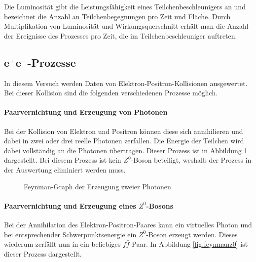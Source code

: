 Die Luminosität gibt die Leistungsfähigkeit eines Teilchenbeschleunigers an und bezeichnet die Anzahl an Teilchenbegegnungen pro Zeit und Fläche. Durch Multiplikation von Luminosität und Wirkungsquerschnitt erhält man die Anzahl der Ereignisse des Prozesses pro Zeit, die im Teilchenbeschleuniger auftreten. \cite{povh}


\subsection{e$^+$e$^-$-Prozesse}\label{sec:e+e-}

In diesem Versuch werden Daten von Elektron-Positron-Kollisionen ausgewertet. Bei dieser Kollision sind die folgenden verschiedenen Prozesse möglich. \cite{demtroeder}
\paragraph{Paarvernichtung und Erzeugung von Photonen}
Bei der Kollision von Elektron und Positron können diese sich annihilieren und dabei in zwei oder drei reelle Photonen zerfallen. Die Energie der Teilchen wird dabei vollständig an die Photonen übertragen. Dieser Prozess ist in Abbildung \ref{fig:feynmanphotonen} dargestellt. Bei diesem Prozess ist kein $Z^0$-Boson beteiligt, weshalb der Prozess in der Auswertung eliminiert werden muss.

\begin{figure}
	\centering
	\caption{Feynman-Graph der Erzeugung zweier Photonen}
	\label{fig:feynmanphotonen}
\end{figure}

\paragraph{Paarvernichtung und Erzeugung eines $Z^0$-Bosons}
Bei der Annihilation des Elektron-Positron-Paares kann ein virtuelles Photon und bei entsprechender Schwerpunktsenergie ein $Z^0$-Boson erzeugt werden. Dieses wiederum zerfällt nun in ein beliebiges $f\bar f$-Paar. In Abbildung \ref{fig:feynmanz0} ist dieser Prozess dargestellt.

